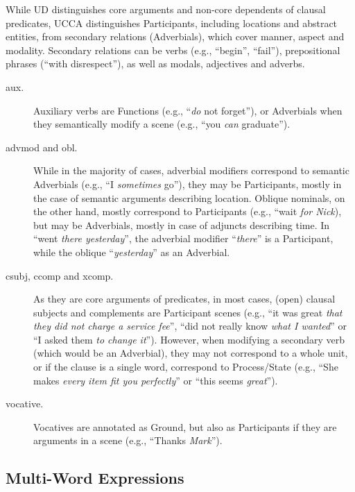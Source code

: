 \documentclass[11pt,a4paper]{article}
\begin{document}
While UD distinguishes core arguments and non-core dependents of clausal predicates,
UCCA distinguishes Participants,
including locations and abstract entities,
from secondary relations (Adverbials), 
which cover manner, aspect and modality.
Secondary relations can be verbs (e.g., ``begin'', ``fail''),
prepositional phrases (``with disrespect''),
as well as modals, adjectives and adverbs.
\begin{description}
    \item[aux.]
    Auxiliary verbs are Functions (e.g., ``\textit{do} not forget''),
    or Adverbials when they semantically modify a scene
    (e.g., ``you \textit{can} graduate'').
    \item[advmod and obl.]
    While in the majority of cases,
    adverbial modifiers correspond to semantic Adverbials
    (e.g., ``I \textit{sometimes} go''),
    they may be Participants,
    mostly in the case of semantic arguments describing location.
    Oblique nominals, on the other hand, mostly correspond to Participants
    (e.g., ``wait \textit{for Nick}), but may be
    Adverbials, mostly in case of adjuncts describing time.
    In ``went \textit{there yesterday}'',
    the adverbial modifier ``\textit{there}'' is a Participant,
    while the oblique ``\textit{yesterday}'' as an Adverbial.
    \item[csubj, ccomp and xcomp.]
    As they are core arguments of predicates,
    in most cases, (open) clausal subjects and complements are Participant scenes
    (e.g., ``it was great \textit{that they did not charge a service fee}'',
    ``did not really know \textit{what I wanted}'' or
    ``I asked them \textit{to change it}'').
    However, when modifying a secondary verb (which would be an Adverbial),
    they may not correspond to a whole unit, or if the clause is a single word,
    correspond to Process/State
    (e.g., ``She makes \textit{every item fit you perfectly}'' or
    ``this seems \textit{great}'').
    \item[vocative.]
    Vocatives are annotated as Ground,
    but also as Participants if they are arguments in a scene
    (e.g., ``Thanks \textit{Mark}'').
\end{description}    
    

\subsection{Multi-Word Expressions}\label{sec:mwe}
\end{document}
